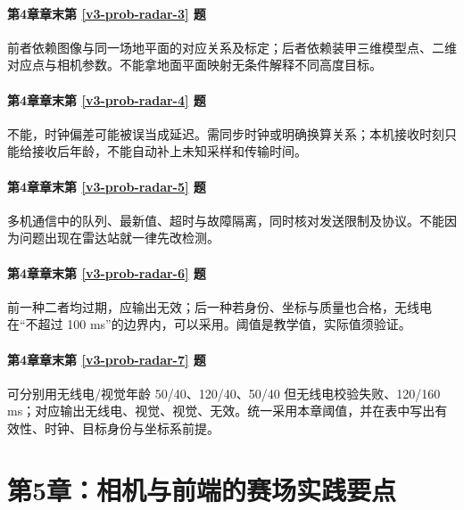 \paragraph*{第4章章末第 \ref{v3-prob-radar-3} 题}
\begin{solution}
前者依赖图像与同一场地平面的对应关系及标定；后者依赖装甲三维模型点、二维对应点与相机参数。不能拿地面平面映射无条件解释不同高度目标。
\end{solution}

\paragraph*{第4章章末第 \ref{v3-prob-radar-4} 题}
\begin{solution}
不能，时钟偏差可能被误当成延迟。需同步时钟或明确换算关系；本机接收时刻只能给接收后年龄，不能自动补上未知采样和传输时间。
\end{solution}

\paragraph*{第4章章末第 \ref{v3-prob-radar-5} 题}
\begin{solution}
多机通信中的队列、最新值、超时与故障隔离，同时核对发送限制及协议。不能因为问题出现在雷达站就一律先改检测。
\end{solution}

\paragraph*{第4章章末第 \ref{v3-prob-radar-6} 题}
\begin{solution}
前一种二者均过期，应输出无效；后一种若身份、坐标与质量也合格，无线电在“不超过 100 ms”的边界内，可以采用。阈值是教学值，实际值须验证。
\end{solution}

\paragraph*{第4章章末第 \ref{v3-prob-radar-7} 题}
\begin{solution}
可分别用无线电/视觉年龄 50/40、120/40、50/40 但无线电校验失败、120/160 ms；对应输出无线电、视觉、视觉、无效。统一采用本章阈值，并在表中写出有效性、时钟、目标身份与坐标系前提。
\end{solution}

\section*{第5章：相机与前端的赛场实践要点}
{}
